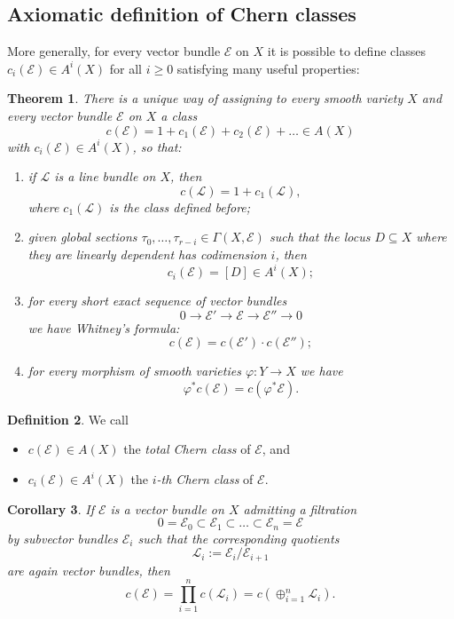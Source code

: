 \documentclass[12pt,a4paper]{amsart}
\theoremstyle{plain}
\newtheorem{thm}{Theorem}[section]
\newtheorem{cor}[thm]{Corollary}
\theoremstyle{definition}
\newtheorem{defn}[thm]{Definition}
\theoremstyle{remark}
\begin{document}
\subsection{Axiomatic definition of Chern classes}

More generally, for every vector bundle $\mathscr{E}$ on $X$ it is possible to define classes $c_{i}(\mathscr{E}) \in A^{i}(X)$ for all $i \geq 0$ satisfying many useful properties:

\begin{thm}
  There is a unique way of assigning to every smooth variety $X$ and every vector bundle $\mathscr{E}$ on $X$ a class
  \[ c(\mathscr{E}) = 1 + c_{1}(\mathscr{E}) + c_{2}(\mathscr{E}) + \ldots \in A(X) \]
  with $c_{i}(\mathscr{E}) \in A^{i}(X)$, so that:
  \begin{enumerate}[label=(\roman*)]
    \item if $\mathscr{L}$ is a line bundle on $X$, then
      \[ c(\mathscr{L}) = 1 + c_{1}(\mathscr{L}), \]
      where $c_{1}(\mathscr{L})$ is the class defined before;
    \item given global sections $\tau_{0}, \ldots, \tau_{r-i} \in \Gamma(X,\mathscr{E})$ such that the locus $D \subseteq X$ where they are linearly dependent has codimension $i$, then
      \[ c_{i}(\mathscr{E}) = [D] \in A^{i}(X); \]
    \item for every short exact sequence of vector bundles
      \[ 0 \to \mathscr{E}' \to \mathscr{E} \to \mathscr{E}'' \to 0 \]
      we have \textit{Whitney's formula}:
      \[ c(\mathscr{E}) = c(\mathscr{E}') \cdot c(\mathscr{E}''); \]
    \item for every morphism of smooth varieties $\varphi \colon Y \to X$ we have
      \[ \varphi^{*}c(\mathscr{E}) = c(\varphi^{*}\mathscr{E}). \]
  \end{enumerate}
\end{thm}

\begin{defn}
  We call
  \begin{itemize}
    \item $c(\mathscr{E}) \in A(X)$ the \textit{total Chern class} of $\mathscr{E}$, and
    \item $c_{i}(\mathscr{E}) \in A^{i}(X)$ the \textit{$i$-th Chern class} of $\mathscr{E}$.
  \end{itemize}
\end{defn}

\begin{cor}\label{cor:filtration}
  If $\mathscr{E}$ is a vector bundle on $X$ admitting a filtration
  \[ 0 = \mathscr{E}_{0} \subset \mathscr{E}_{1} \subset \ldots \subset \mathscr{E}_{n} = \mathscr{E} \]
  by subvector bundles $\mathscr{E}_{i}$ such that the corresponding quotients
  \[ \mathscr{L}_{i} := \mathscr{E}_{i} / \mathscr{E}_{i+1} \]
  are again vector bundles, then
  \[ c(\mathscr{E}) = \prod_{i=1}^{n} c(\mathscr{L}_{i}) = c\left(\oplus_{i=1}^{n}\mathscr{L}_{i}\right). \]
\end{cor}
\end{document}
